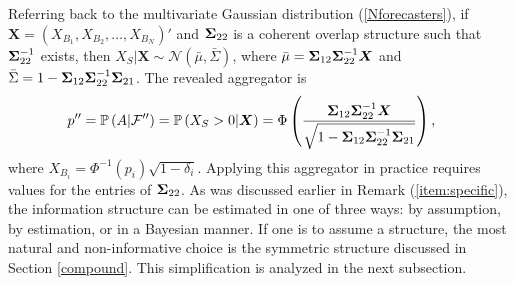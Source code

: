 \documentclass[12pt]{article}
\renewcommand{\P}{\mathbb{P}}
\theoremstyle{definition}
\theoremstyle{definition}
\def\one{{\bf 1}}
\def\F{{\cal F}}
\def\P{{\mathbb P}}
\def\probit{p_{\rm probit}}
\begin{document}
Referring back to the multivariate Gaussian distribution
(\ref{Nforecasters}), if $\boldsymbol{X} = (X_{B_1}, X_{B_2}, \dots,
X_{B_N})'$ and ${\bf\Sigma}_{22}$ is a
coherent overlap structure such that ${\bf\Sigma}_{22}^{-1}$ exists, then $X_{S} | \boldsymbol{X} \sim \mathcal{N}\left(\bar{\mu}, \bar{\Sigma}\right)$, where $\bar{\mu} 
  = {\bf \Sigma}_{12} {\bf\Sigma}_{22}^{-1} \boldsymbol{X}$ and $\bar{\Sigma} = 1 - {\bf\Sigma}_{12} {\bf\Sigma}_{22}^{-1} {\bf\Sigma}_{21}$. 
%
The revealed aggregator is
\begin{align}
p'' & =  \P\left(A  | \F''\right) =  \P\left(X_{S} > 0 | \boldsymbol{X}\right) = \Phi\left( \frac{{\bf\Sigma}_{12} {\bf\Sigma}_{22}^{-1} \boldsymbol{X}}
   {\sqrt{1 - {\bf\Sigma}_{12} {\bf\Sigma}_{22}^{-1} {\bf\Sigma}_{21}}}\right), 
\label{GeneralAggregator} \,
\end{align}
 where $X_{B_i} =
\Phi^{-1}(p_i)\sqrt{1-\delta_i}$. Applying this aggregator in practice requires values for the entries of ${\bf\Sigma}_{22}$.
As  was discussed earlier in Remark (\ref{item:specific}), the information structure can be estimated in one of three ways: by
assumption, by estimation, or in a Bayesian manner. If one is to
assume a structure, the most natural and non-informative choice is the
symmetric structure discussed in Section \ref{compound}. This simplification is analyzed in the next subsection.
%
\end{document}

